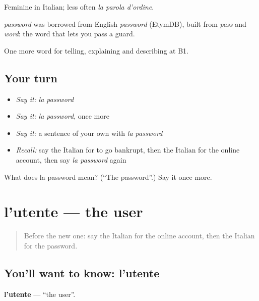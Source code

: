 Feminine in Italian; less often \emph{la parola d'ordine}.

\begin{cousinweb}
\emph{password} was borrowed from English \emph{password} (EtymDB), built from \emph{pass} and \emph{word}: the word that lets you pass a guard.
\end{cousinweb}

\begin{grammarlens}[title={What you've built}]
One more word for telling, explaining and describing at B1.
\end{grammarlens}

\subsection*{Your turn}
\begin{itemize}
\raggedright
  \item \emph{Say it:} \emph{la password}
  \item \emph{Say it:} \emph{la password}, once more
  \item \emph{Say it:} a sentence of your own with \emph{la password}
  \item \emph{Recall:} say the Italian for to go bankrupt, then the Italian for the online account, then say \emph{la password} again
\end{itemize}

\begin{tcolorbox}[breakable,colback=teal!4,colframe=teal!35!black,title={Before you move on}]
What does la password mean? (\textquotedblleft{}The password\textquotedblright{}.) Say it once more.
\end{tcolorbox}
\section[l'utente]{l'utente — the user}

\label{lesson:IT-C399-utente}



\begin{quote}
Before the new one: say the Italian for the online account, then the Italian for the password.
\end{quote}

\subsection*{You'll want to know: l'utente}
\textbf{l'utente} — \textquotedblleft{}the user\textquotedblright{}.

